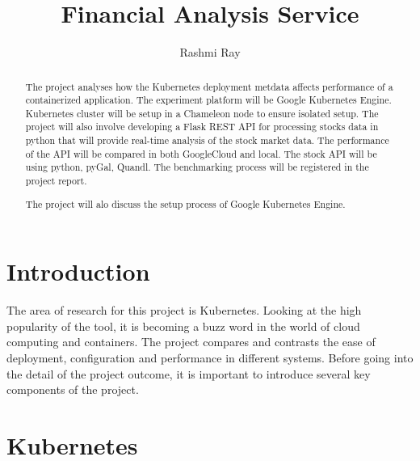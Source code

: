 
\title{Financial Analysis Service}

\author{Rashmi Ray}

\renewcommand{\shortauthors}{Rashmi Ray}

\begin{abstract}
  The project analyses how the Kubernetes deployment metdata affects
  performance of a containerized application. The experiment platform will be
  Google Kubernetes Engine. Kubernetes cluster will be setup in a Chameleon
  node to ensure isolated setup. The project will also involve developing a
  Flask REST API for processing stocks data in python that will provide
  real-time analysis of the stock market data. The performance of the API will
  be compared in both GoogleCloud and local. The stock API will be using
  python, pyGal, Quandl. The benchmarking process will be registered in the
  project report. 
  
  The project will alo discuss the setup process of Google Kubernetes Engine.
   

\end{abstract}



\maketitle

\section{Introduction}

The area of research for this project is Kubernetes. Looking at the high
popularity of the tool, it is becoming a buzz word in the world of cloud
computing and containers. The project compares and contrasts the ease of
deployment, configuration and performance in different systems. Before going
into the detail of the project outcome, it is important to introduce several
key components of the project.

\section{Kubernetes}

